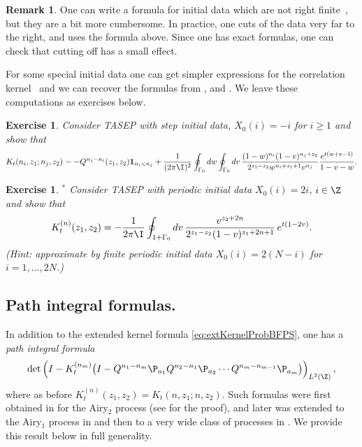 \documentclass[]{pcmi}
\theoremstyle{plain}
\newtheorem{exercise}[equation]{Exercise}
\theoremstyle{definition}
\newtheorem{remark}[equation]{Remark}
\newcommand{\uno}[1]{\mathbf{1}_{#1}}
\begin{document}
\begin{remark}  One can write a formula for initial data which are not right finite~\cite{KPZ}, but they are a bit more cumbersome.  In practice,
one cuts of the data very far to the right, and uses the formula above.  Since one has exact formulas, one can check that cutting off has a small effect.
\end{remark}

For some special initial data one can get simpler expressions for the correlation kernel~\cite{KPZ} and we can recover the formulas from \cite{borFerPrahSasam}, \cite{ferrariMatr} and \cite{bfp}. We leave these computations as exercises below.

\begin{exercise}
Consider TASEP with step initial data, $X_0(i) = -i$ for $i \geq 1$ and show that
\[
K_t(n_i,z_1;n_j,z_2)=-Q^{n_j-n_i}(z_1, z_2)\uno{n_i<n_j} + \frac{1}{(2\pi\I)^2} \oint_{\Gamma_0}dw \oint_{\Gamma_0}dv\, \frac{(1-w)^{n_i} (1-v)^{n_j + z_2}}{2^{z_1-z_2} w^{n_i + z_1 +1} v^{n_j}} \frac{e^{t(w + v-1)}}{1 - v - w}.
\]
\end{exercise}

\begin{exercise}$\!\!\!\!{}^*$
Consider TASEP with periodic initial data $X_0(i)=2i$, $i\in\Z$ and show that 
\[K^{(n)}_t(z_1,z_2)=-\frac1{2\pi\I}\oint_{1+\Gamma_{0}}dv\, \frac{v^{z_2+2n}}{2^{z_1-z_2}(1-v)^{z_1+2n+1}}\, e^{t(1-2v)}.\]
(Hint:  approximate by finite periodic initial data $X_0(i) = 2(N-i)$ for $i=1,\ldots,2N$.)
\end{exercise}

\subsection{Path integral formulas.}

In addition to the extended kernel formula \eqref{eq:extKernelProbBFPS}, one has a \emph{path integral formula}
\begin{equation}
\det \left(I-K^{(n_m)}_{t} \bigl(I-Q^{n_1-n_m}\P_{a_1}Q^{n_2-n_1}\P_{a_2}\dotsm Q^{n_m-n_{m-1}}\P_{a_m}\bigr)\right)_{L^2(\Z)},\label{eq:path-int-kernel-TASEPgem}
\end{equation}
where as before $K^{(n)}_t(z_1,z_2)=K_t(n,z_1;n,z_2)$. Such formulas were first obtained in \cite{prahoferSpohn} for the Airy$_2$ process (see \cite{prolhacSpohn} for the proof), and later was extended to the Airy$_1$ process in \cite{quastelRemAiry1} and then to a very wide class of processes in \cite{bcr}. We provide this result below in full generality.
\end{document}
